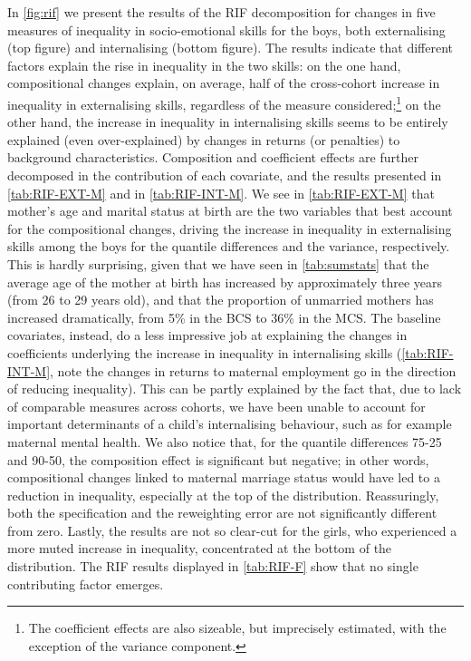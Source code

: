 In \autoref{fig:rif} we present the results of the RIF decomposition for changes in five measures of inequality in socio-emotional skills for the boys, both externalising (top figure) and internalising (bottom figure). The results indicate that different factors explain the rise in inequality in the two skills: on the one hand, compositional changes explain, on average, half of the cross-cohort increase in inequality in externalising skills, regardless of the measure considered;\footnote{The coefficient effects are also sizeable, but imprecisely estimated, with the exception of the variance component.} on the other hand, the increase in inequality in internalising skills seems to be entirely explained (even over-explained) by changes in returns (or penalties) to background characteristics. Composition and coefficient effects are further decomposed in the contribution of each covariate, and the results presented in \autoref{tab:RIF-EXT-M} and in \autoref{tab:RIF-INT-M}. We see in \autoref{tab:RIF-EXT-M} that mother's age and marital status at birth are the two variables that best account for the compositional changes, driving the increase in inequality in externalising skills among the boys for the quantile differences and the variance, respectively. This is hardly surprising, given that we have seen in \autoref{tab:sumstats} that the average age of the mother at birth has increased by approximately three years (from 26 to 29 years old), and that the proportion of unmarried mothers has increased dramatically, from 5\% in the BCS to 36\% in the MCS. The baseline covariates, instead, do a less impressive job at explaining the changes in coefficients underlying the increase in inequality in internalising skills (\autoref{tab:RIF-INT-M}, note the changes in returns to maternal employment go in the direction of reducing inequality). This can be partly explained by the fact that, due to lack of comparable measures across cohorts, we have been unable to account for important determinants of a child's internalising behaviour, such as for example maternal mental health. We also notice that, for the quantile differences 75-25 and 90-50, the composition effect is significant but negative; in other words, compositional changes linked to maternal marriage status would have led to a reduction in inequality, especially at the top of the distribution. Reassuringly, both the specification and the reweighting error are not significantly different from zero. Lastly, the results are not so clear-cut for the girls, who experienced a more muted increase in inequality, concentrated at the bottom of the distribution. The RIF results displayed in \autoref{tab:RIF-F} show that no single contributing factor emerges.

